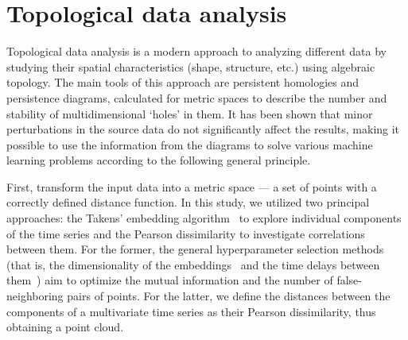 \documentclass[journal,twoside,web]{ieeecolor2}
\begin{document}
\section{Topological data analysis}

Topological data analysis is a modern approach to analyzing different data by studying their spatial characteristics (shape, structure, etc.) using algebraic topology. The main tools of this approach are persistent homologies and persistence diagrams, calculated for metric spaces to describe the number and stability of multidimensional `holes' in them. It has been shown that minor perturbations in the source data do not significantly affect the results, making it possible to use the information from the diagrams to solve various machine learning problems according to the following general principle.

First, transform the input data into a metric space --- a set of points with a correctly defined distance function. In this study, we utilized two principal approaches: the Takens' embedding algorithm~\cite{10.1007/BFb0091924,perea2013slidingwindowspersistenceapplication} to explore individual components of the time series and the Pearson dissimilarity to investigate correlations between them. For the former, the general hyperparameter selection methods (that is, the dimensionality of the embeddings~\cite{PhysRevA.45.3403} and the time delays between them~\cite{PhysRevA.33.1134}) aim to optimize the mutual information and the number of false-neighboring pairs of points. For the latter, we define the distances between the components of a multivariate time series as their Pearson dissimilarity, thus obtaining a point cloud.
\end{document}
